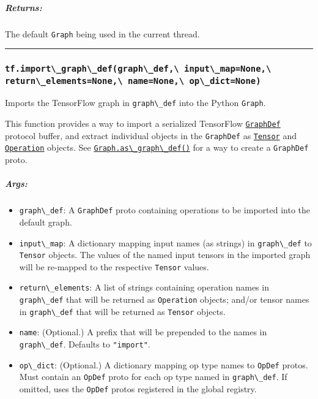 \subparagraph{Returns: }\label{returns-28}

The default \lstinline{Graph} being used in the current thread.

\begin{center}\rule{0.5\linewidth}{\linethickness}\end{center}

\subsubsection{\texorpdfstring{\lstinline{tf.import\_graph\_def(graph\_def,\ input\_map=None,\ return\_elements=None,\ name=None,\ op\_dict=None)}
}{tf.import\_graph\_def(graph\_def, input\_map=None, return\_elements=None, name=None, op\_dict=None) }}\label{tf.importux5fgraphux5fdefgraphux5fdef-inputux5fmapnone-returnux5felementsnone-namenone-opux5fdictnone}

Imports the TensorFlow graph in \lstinline{graph\_def} into the Python
\lstinline{Graph}.

This function provides a way to import a serialized TensorFlow
\href{https://tensorflow.googlesource.com/tensorflow/+/master/tensorflow/core/framework/graph.proto}{\lstinline{GraphDef}}
protocol buffer, and extract individual objects in the \lstinline{GraphDef}
as \protect\hyperlink{Tensor}{\lstinline{Tensor}} and
\protect\hyperlink{Operation}{\lstinline{Operation}} objects. See
\protect\hyperlink{Graph.asux5fgraphux5fdef}{\lstinline{Graph.as\_graph\_def()}}
for a way to create a \lstinline{GraphDef} proto.

\subparagraph{Args: }\label{args-25}

\begin{itemize}
\tightlist
\item
  \lstinline{graph\_def}: A \lstinline{GraphDef} proto containing operations
  to be imported into the default graph.
\item
  \lstinline{input\_map}: A dictionary mapping input names (as strings) in
  \lstinline{graph\_def} to \lstinline{Tensor} objects. The values of the
  named input tensors in the imported graph will be re-mapped to the
  respective \lstinline{Tensor} values.
\item
  \lstinline{return\_elements}: A list of strings containing operation
  names in \lstinline{graph\_def} that will be returned as
  \lstinline{Operation} objects; and/or tensor names in \lstinline{graph\_def}
  that will be returned as \lstinline{Tensor} objects.
\item
  \lstinline{name}: (Optional.) A prefix that will be prepended to the
  names in \lstinline{graph\_def}. Defaults to \lstinline{"import"}.
\item
  \lstinline{op\_dict}: (Optional.) A dictionary mapping op type names to
  \lstinline{OpDef} protos. Must contain an \lstinline{OpDef} proto for each
  op type named in \lstinline{graph\_def}. If omitted, uses the
  \lstinline{OpDef} protos registered in the global registry.
\end{itemize}

